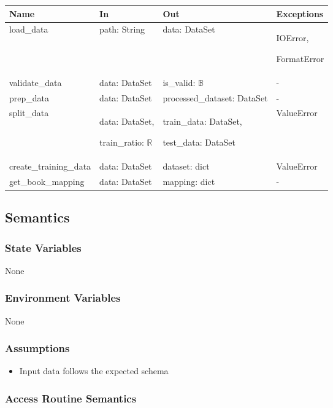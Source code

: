 \documentclass[12pt, titlepage]{article}
\begin{document}
\begin{center}
  \begin{tabular}{p{4cm} p{4cm} p{4cm} p{2cm}}
  \hline
  \textbf{Name} & \textbf{In} & \textbf{Out} & \textbf{Exceptions} \\
  \hline
  load\_data & path: String & data: DataSet & IOError,
  
  FormatError\\
  \hline
  validate\_data & data: DataSet & is\_valid: $\mathbb{B}$ & -\\
  \hline
  prep\_data & data: DataSet & processed\_dataset: DataSet & - \\
  \hline
  split\_data & data: DataSet,
  
  train\_ratio: $\mathbb{R}$ & train\_data: DataSet,
  
  test\_data: DataSet & ValueError \\
  \hline
  create\_training\_data & data: DataSet & dataset: dict & ValueError \\
  \hline
  get\_book\_mapping & data: DataSet & mapping: dict & - \\
  \hline
  \end{tabular}
  \end{center}


\subsection{Semantics}

\subsubsection{State Variables}
None

\subsubsection{Environment Variables}

None

\subsubsection{Assumptions}

\begin{itemize}
  \item Input data follows the expected schema
\end{itemize}

\subsubsection{Access Routine Semantics}
\end{document}

